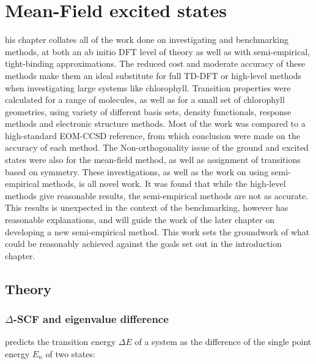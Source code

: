 %
%
\chapter{Mean-Field excited states}
\label{chap:dscf}

his chapter collates all of the work done on investigating and benchmarking
\dscf methods, at both an ab initio DFT level of theory as well as with semi-empirical, 
tight-binding approximations. The reduced cost and moderate accuracy of these methods
make them an ideal substitute for full TD-DFT or high-level methods when investigating
large systems like chlorophyll.
Transition properties were calculated for a range of molecules, as well as
for a small set of chlorophyll geometries, using variety of different basis sets,
density functionals, response methods and electronic structure methods. Most of 
the work was compared to a high-standard EOM-CCSD reference, from which conclusion 
were made on the accuracy of each method. The Non-orthogonality issue of the ground
and excited states were also for the mean-field \dscf method, as well as assignment
of transitions based on symmetry. These investigations, as well as the work on using 
semi-empirical methods, is all novel work. 
It was found that while the high-level methods give reasonable results, the semi-empirical
\dscf methods are not as accurate. This results is unexpected in the context of
the benchmarking, however has reasonable explanations, and will guide the work
of the later chapter on developing a new semi-empirical method. This work sets the
groundwork of what could be reasonably achieved against the goals set out in the
introduction chapter.

\section{Theory}
\label{sec:dscf_theory}
\subsection{$\Delta$-SCF and eigenvalue difference}
\label{subsec{dscf_and_eigdiff}}

\dscf predicts the transition energy $\Delta E$ of a system as the difference of
the single point energy $E_n$ of two states:


